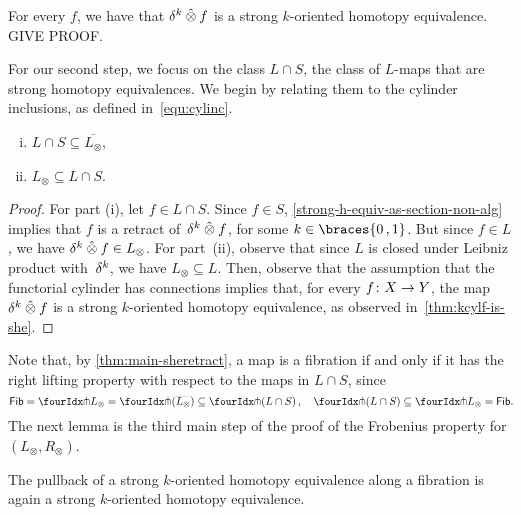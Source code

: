 \documentclass[reqno,10pt,a4paper,oneside,draft]{amsart}
\begin{document}
{{\begin{remark} \label{thm:kcylf-is-she}
For every $f$, we have that $\delta^k \mathbin{\hat{\otimes}} f$ is a strong $k$-oriented homotopy equivalence. GIVE PROOF.
\end{remark} 

For our second step, we focus on the class $L \cap S$, \ie the class of $L$-maps that are strong homotopy equivalences. We begin by relating them to the cylinder inclusions, as defined in~\eqref{equ:cylinc}.

\begin{lemma}  \label{thm:main-sheretract} \hfill 
\begin{enumerate}[(i)] 
\item $L \cap S \subseteq \overline{L_\otimes}$,
\item $L_\otimes \subseteq L \cap S$. 
\end{enumerate}
\end{lemma}

\begin{proof} For part (i), let $f \in  L \cap S$. Since $f \in S$, \cref{strong-h-equiv-as-section-non-alg} implies that $f$ is a retract of~$\delta^k \mathbin{\hat{\otimes}} f$, for some $k \in \braces{0 \, , 1 }$. But since $f \in L$, we have $\delta^k \mathbin{\hat{\otimes}} f \in L_\otimes$. For part~(ii), observe that since $L$ is closed under Leibniz product with~$\delta^k$, we have $L_\otimes  \subseteq L$.
Then, observe that the assumption that the functorial cylinder has connections implies that, 
for every $f \colon X \to Y$, the map $\delta^k \mathbin{\hat{\otimes}} f$ is a strong $k$-oriented homotopy equivalence, as observed 
in~\cref{thm:kcylf-is-she}.
\end{proof}


Note that, by \cref{thm:main-sheretract}, a map is a fibration if and only if it has the right lifting property with respect to the maps in $L \cap S$,
since
\[
  \Fib =  \liftr{L_\otimes} = \liftr{(\overline{L_\otimes})} \subseteq \liftr{(L \cap S)} \, , \quad
  \liftr{(L \cap S)}  \subseteq \liftr{L_\otimes} = \Fib \rlap{.} 
\]
The next lemma is the third main step of the proof of the Frobenius property for $(L_\otimes, R_\otimes)$. 

\begin{lemma} 
\label{thm:non-alg-frobenius-she}
The pullback of a strong $k$-oriented homotopy equivalence along a fibration is again a strong $k$-oriented 
homotopy equivalence.
\end{lemma} 

}}
\end{document}
